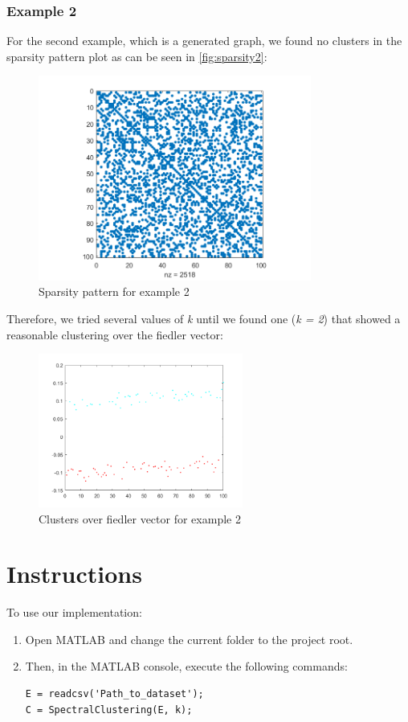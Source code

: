 \documentclass[12pt, a4paper]{article}
\begin{document}
\subsubsection{Example 2}
For the second example, which is a generated graph, we found no clusters in the sparsity pattern plot as can be seen in \autoref{fig:sparsity2}:

\begin{figure}[H]
\centering
	\includegraphics[width=0.8\textwidth]{../plots/sparsity_ex2.png}
	\caption{Sparsity pattern for example 2}
	\label{fig:sparsity2}
\end{figure}

Therefore, we tried several values of \emph{k} until we found one (\emph{k = 2}) that showed a reasonable clustering over the fiedler vector:

\begin{figure}[H]
\centering
	\includegraphics[width=0.6\textwidth]{../plots/clusters_ex2.png}
	\caption{Clusters over fiedler vector for example 2}
\end{figure}

\section{Instructions}
To use our implementation:
\begin{enumerate}
\item Open MATLAB and change the current folder to the project root.
\item Then, in the MATLAB console, execute the following commands:
\lstset{language=MATLAB}
\begin{lstlisting}[frame=single]
E = readcsv('Path_to_dataset');
C = SpectralClustering(E, k);
\end{lstlisting}
\end{enumerate}
\end{document}

